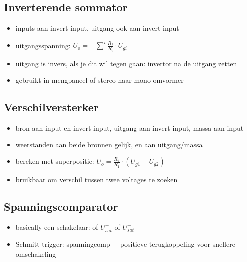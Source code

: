 \documentclass[11pt]{article}
\let\originalitem\item
\renewcommand{\item}{\originalitem[]}
\newcommand{\Newpage}{\end{preview}\begin{preview}}
\begin{document}
\begin{preview}
\Newpage
\section{Inverterende sommator}

\begin{itemize}
  \item inputs aan invert input, uitgang ook aan invert input
  \item uitgangsspanning: $ U_o = - \sum^i{\frac{R_f}{R_i}\cdot U_{gi}} $
  \item uitgang is invers, als je dit wil tegen gaan: invertor na de uitgang zetten
  \item gebruikt in mengpaneel of stereo-naar-mono omvormer
\end{itemize}

\Newpage
\section{Verschilversterker}

\begin{itemize}
  \item bron aan input en invert input, uitgang aan invert input, massa aan input
  \item weerstanden aan beide bronnen gelijk, en aan uitgang/massa
  \item bereken met superpositie: $ U_o = \frac{R_4}{R_1} \cdot (U_{g1} - U_{g2}) $
  \item bruikbaar om verschil tussen twee voltages te zoeken
\end{itemize}

\Newpage
\section{Spanningscomparator}

\begin{itemize}
  \item basically een schakelaar: of $ U_{sat}^+ $ of $ U_{sat}^- $
  \item Schmitt-trigger: spanningcomp + positieve terugkoppeling voor snellere omschakeling
\end{itemize}


\end{preview}
\end{document}
